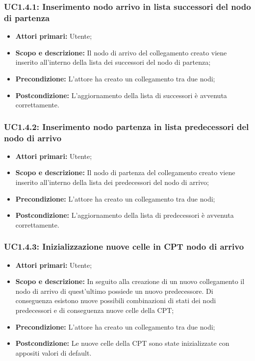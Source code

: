 \subsubsection{UC1.4.1: Inserimento nodo arrivo in lista successori del nodo di partenza} 
\begin{itemize} 
	\item{\textbf{Attori primari:} Utente;} 
	\item{\textbf{Scopo e descrizione:} Il nodo di arrivo del collegamento creato viene inserito all'interno della lista dei successori del nodo di partenza;} 
	\item{\textbf{Precondizione:} L'attore ha creato un collegamento tra due nodi;} 
	\item{\textbf{Postcondizione:} L'aggiornamento della lista di successori è avvenuta correttamente.} 
\end{itemize} 
\subsubsection{UC1.4.2: Inserimento nodo partenza in lista predecessori del nodo di arrivo} 
\begin{itemize} 
	\item{\textbf{Attori primari:} Utente;} 
	\item{\textbf{Scopo e descrizione:} Il nodo di partenza del collegamento creato viene inserito all'interno della lista dei predecessori del nodo di arrivo;} 
	\item{\textbf{Precondizione:} L'attore ha creato un collegamento tra due nodi;} 
	\item{\textbf{Postcondizione:} L'aggiornamento della lista di predecessori è avvenuta correttamente.} 
\end{itemize} 
\subsubsection{UC1.4.3: Inizializzazione nuove celle in CPT nodo di arrivo} 
\begin{itemize} 
	\item{\textbf{Attori primari:} Utente;} 
	\item{\textbf{Scopo e descrizione:} In seguito alla creazione di un nuovo collegamento il nodo di arrivo di quest'ultimo possiede un nuovo predecessore. Di conseguenza esistono nuove possibili combinazioni di stati dei nodi predecessori e di conseguenza nuove celle della CPT;} 
	\item{\textbf{Precondizione:} L'attore ha creato un collegamento tra due nodi;} 
	\item{\textbf{Postcondizione:} Le nuove celle della CPT sono state inizializzate con appositi valori di default.} 
\end{itemize} 
